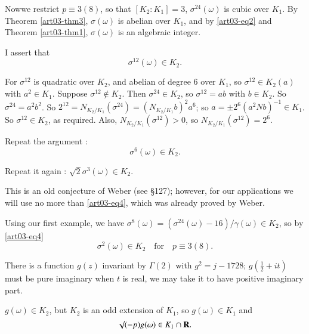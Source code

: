 Now\pageoriginale we restrict $p\equiv 3(8)$, so that $[K_{2}:K_{1}]=3$, $\sigma^{24}(\omega)$ is cubic over $K_{1}$. By Theorem \ref{art03-thm3}, $\sigma(\omega)$ is abelian over $K_{1}$, and by \eqref{art03-eq2} and Theorem \ref{art03-thm1}, $\sigma(\omega)$ is an algebraic integer.

I assert that
\begin{equation}
\sigma^{12}(\omega)\in K_{2}.\label{art03-eq3}
\end{equation}

For $\sigma^{12}$ is quadratic over $K_{2}$, and abelian of degree 6 over $K_{1}$, so $\sigma^{12}\in K_{2}(a)$ with $a^{2}\in K_{1}$. Suppose $\sigma^{12}\not\in K_{2}$. Then $\sigma^{24}\in K_{2}$, so $\sigma^{12}=ab$ with $b\in K_{2}$. So $\sigma^{24}=a^{2}b^{2}$. So $2^{12}=N_{K_{2}/K_{1}}(\sigma^{24})=(N_{K_{2}/K_{1}}b)^{2}a^{6}$; so $a=\pm 2^{6}(a^{2}Nb)^{-1}\in K_{1}$. So $\sigma^{12}\in K_{2}$, as required. Also, $N_{K_{2}/K_{1}}(\sigma^{12})>0$, so $N_{K_{2}/K_{1}}(\sigma^{12})=2^{6}$.

Repeat the argument :
\begin{equation}
\sigma^{6}(\omega)\in K_{2}.\label{art03-eq4}
\end{equation}

Repeat it again : $\surd 2 \sigma^{3}(\omega)\in K_{2}$.

This is an old conjecture of Weber (see \cite{art03-key9} \S127); however, for our applications we will use no more than \eqref{art03-eq4}, which was already proved by Weber.

Using our first example, we have $\sigma^{8}(\omega)=(\sigma^{24}(\omega)-16)/\gamma(\omega)\in K_{2}$, so by \eqref{art03-eq4}
\begin{equation}
\sigma^{2}(\omega)\in K_{2}\text{~~ for~~ } p\equiv 3(8).\label{art03-eq5}
\end{equation}

\begin{example}\label{art03-exam3}
There is a function $g(z)$ invariant by $\Gamma(2)$ with $g^{2}=j-1728$; $g(\frac{1}{2}+it)$ must be pure imaginary when $t$ is real, we may take it to have positive imaginary part.

$g(\omega)\in K_{2}$, but $K_{2}$ is an odd extension of $K_{1}$, so $g(\omega)\in K_{1}$ and
\begin{equation}
\surd (-p)g(\omega)\in K_{1}\cap \mathbf{R}.\label{art03-eq6}
\end{equation}
\end{example}

